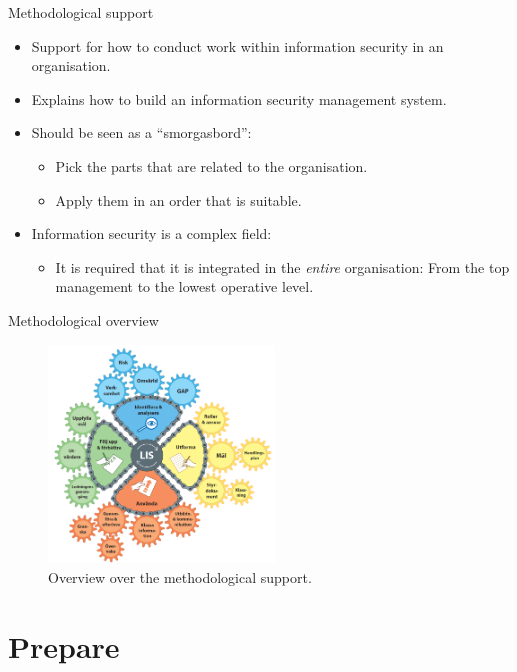 \documentclass{beamer}
\begin{document}
\begin{frame}{Methodological support}
  \begin{itemize}
    \item Support for how to conduct work within information security in an
      organisation.

    \item Explains how to build an information security management system.

    \item Should be seen as a \enquote{smorgasbord}:
      \begin{itemize}
        \item Pick the parts that are related to the organisation.
        \item Apply them in an order that is suitable.
      \end{itemize}

    \item Information security is a complex field:
      \begin{itemize}
        \item It is required that it is integrated in the \emph{entire}
          organisation: From the top management to the lowest operative level.
      \end{itemize}

  \end{itemize}
\end{frame}

\begin{frame}{Methodological overview}
  \begin{figure}
    \includegraphics[width=6cm]{metodstod-overview.png}
    \caption{Overview over the methodological support.}
  \end{figure}
\end{frame}

\section{Prepare}
\end{document}
